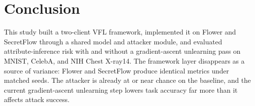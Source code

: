 \documentclass[sigconf,anonymous]{acmart}
\begin{document}
\section{Conclusion}

This study built a two-client VFL framework, implemented it on Flower and SecretFlow through a shared model and attacker module, and evaluated attribute-inference risk with and without a gradient-ascent unlearning pass on MNIST, CelebA, and NIH Chest X-ray14. The framework layer disappears as a source of variance: Flower and SecretFlow produce identical metrics under matched seeds. The attacker is already at or near chance on the baseline, and the current gradient-ascent unlearning step lowers task accuracy far more than it affects attack success.




\end{document}
